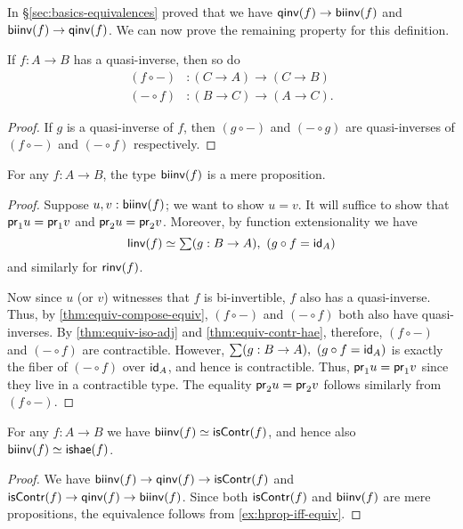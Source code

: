In \S\ref{sec:basics-equivalences} proved that we have $\qinv(f)\to\biinv(f)$ and $\biinv(f)\to\qinv(f)$.
We can now prove the remaining property for this definition.

\begin{lem}\label{thm:equiv-compose-equiv}
  If $f:A\to B$ has a quasi-inverse, then so do
  \begin{align*}
    (f\circ -) &: (C\to A) \to (C\to B)\\
    (-\circ f) &: (B\to C) \to (A\to C).
  \end{align*}
\end{lem}
\begin{proof}
  If $g$ is a quasi-inverse of $f$, then $(g\circ -)$ and $(-\circ g)$ are quasi-inverses of $(f\circ -)$ and $(-\circ f)$ respectively.
\end{proof}

\begin{thm}\label{thm:isprop-biinv}
  For any $f:A\to B$, the type $\biinv(f)$ is a mere proposition.
\end{thm}
\begin{proof}
  Suppose $u,v:\biinv(f)$; we want to show $u=v$.
  It will suffice to show that $\proj1u = \proj1v$ and $\proj2u=\proj2v$.
  Moreover, by function extensionality we have
  \[\eqv{\linv(f)}{\sm{g:B\to A} (g\circ f = \idfunc[A])}\]
  and similarly for $\rinv(f)$.

  Now since $u$ (or $v$) witnesses that $f$ is bi-invertible, $f$ also has a quasi-inverse.
  Thus, by \autoref{thm:equiv-compose-equiv}, $(f\circ -)$ and $(-\circ f)$ both also have quasi-inverses.
  By \autoref{thm:equiv-iso-adj} and \autoref{thm:equiv-contr-hae}, therefore, $(f\circ -)$ and $(-\circ f)$ are contractible.
  However, ${\sm{g:B\to A} (g\circ f = \idfunc[A])}$ is exactly the fiber of $(-\circ f)$ over $\idfunc[A]$, and hence is contractible.
  Thus, $\proj1u = \proj1v$ since they live in a contractible type.
  The equality $\proj2u=\proj2v$ follows similarly from $(f\circ -)$.
\end{proof}

\begin{cor}\label{thm:equiv-biinv-isequiv}
  For any $f:A\to B$ we have $\eqv{\biinv(f)}{\iscontr(f)}$, and hence also $\eqv{\biinv(f)}{\ishae(f)}$.
\end{cor}
\begin{proof}
  We have $\biinv(f) \to \qinv(f) \to \iscontr(f)$ and $\iscontr(f) \to \qinv(f) \to \biinv(f)$.
  Since both $\iscontr(f)$ and $\biinv(f)$ are mere propositions, the equivalence follows from \autoref{ex:hprop-iff-equiv}.
\end{proof}

